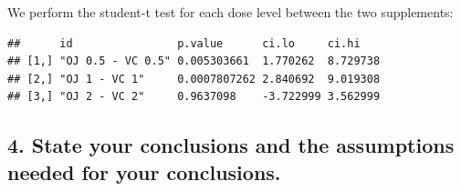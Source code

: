 \documentclass[]{article}
\newenvironment{Shaded}{\begin{snugshade}}{\end{snugshade}}
\newcommand{\ControlFlowTok}[1]{\textcolor[rgb]{0.13,0.29,0.53}{\textbf{#1}}}
\newcommand{\DataTypeTok}[1]{\textcolor[rgb]{0.13,0.29,0.53}{#1}}
\newcommand{\DecValTok}[1]{\textcolor[rgb]{0.00,0.00,0.81}{#1}}
\newcommand{\KeywordTok}[1]{\textcolor[rgb]{0.13,0.29,0.53}{\textbf{#1}}}
\newcommand{\NormalTok}[1]{#1}
\newcommand{\OperatorTok}[1]{\textcolor[rgb]{0.81,0.36,0.00}{\textbf{#1}}}
\newcommand{\StringTok}[1]{\textcolor[rgb]{0.31,0.60,0.02}{#1}}
\begin{document}
We perform the student-t test for each dose level between the two
supplements:

\begin{Shaded}
\end{Shaded}

\begin{verbatim}
##      id                p.value      ci.lo     ci.hi   
## [1,] "OJ 0.5 - VC 0.5" 0.005303661  1.770262  8.729738
## [2,] "OJ 1 - VC 1"     0.0007807262 2.840692  9.019308
## [3,] "OJ 2 - VC 2"     0.9637098    -3.722999 3.562999
\end{verbatim}

\hypertarget{state-your-conclusions-and-the-assumptions-needed-for-your-conclusions.}{%
\subsection{4. State your conclusions and the assumptions needed for
your
conclusions.}\label{state-your-conclusions-and-the-assumptions-needed-for-your-conclusions.}}
\end{document}

